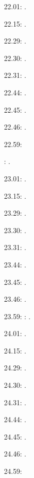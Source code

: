 \documentclass[italian]{article}
\begin{document}
22.01:     . 

22.15:     . 

22.29:     . 

22.30:     .

22.31:     .

22.44:     .

22.45:     .

22.46:     .

22.59:     

:    .

23.01:     . 

23.15:     . 

23.29:     . 

23.30:     .

23.31:     .

23.44:     .

23.45:     .

23.46:     .

23.59:     
:    .

24.01:     . 

24.15:     . 

24.29:     . 

24.30:     .

24.31:     .

24.44:     .

24.45:     .

24.46:     .

24.59:     
\end{document}
